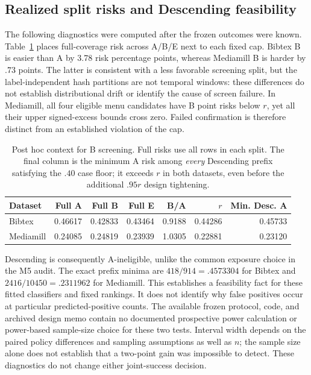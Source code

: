 \subsection{Realized split risks and Descending feasibility}
\label{sec:v13-split-diagnostics}
The following diagnostics were computed after the frozen outcomes were known. Table~\ref{tab:v13-split-risk} places full-coverage risk across A/B/E next to each fixed cap. Bibtex B is easier than A by 3.78 risk percentage points, whereas Mediamill B is harder by .73 points. The latter is consistent with a less favorable screening split, but the label-independent hash partitions are not temporal windows: these differences do not establish distributional drift or identify the cause of screen failure. In Mediamill, all four eligible menu candidates have B point risks below $r$, yet all their upper signed-excess bounds cross zero. Failed confirmation is therefore distinct from an established violation of the cap.

\begin{table}[H]\centering\small
\setlength{\tabcolsep}{4pt}
\caption{Post hoc context for B screening. Full risks use all rows in each split. The final column is the minimum A risk among \emph{every} Descending prefix satisfying the $.40$ case floor; it exceeds $r$ in both datasets, even before the additional $.95r$ design tightening.}
\label{tab:v13-split-risk}
\begin{tabular}{lrrrrrr}\toprule
Dataset & Full A & Full B & Full E & B/A & $r$ & Min. Desc. A\\\midrule
Bibtex & 0.46617 & 0.42833 & 0.43464 & 0.9188 & 0.44286 & 0.45733 \\
Mediamill & 0.24085 & 0.24819 & 0.23939 & 1.0305 & 0.22881 & 0.23120 \\
\bottomrule\end{tabular}
\end{table}

Descending is consequently A-ineligible, unlike the common exposure choice in the M5 audit. The exact prefix minima are $418/914=.4573304$ for Bibtex and $2416/10450=.2311962$ for Mediamill. This establishes a feasibility fact for these fitted classifiers and fixed rankings. It does not identify why false positives occur at particular predicted-positive counts. The available frozen protocol, code, and archived design memo contain no documented prospective power calculation or power-based sample-size choice for these two tests. Interval width depends on the paired policy differences and sampling assumptions as well as $n$; the sample size alone does not establish that a two-point gain was impossible to detect. These diagnostics do not change either joint-success decision.

